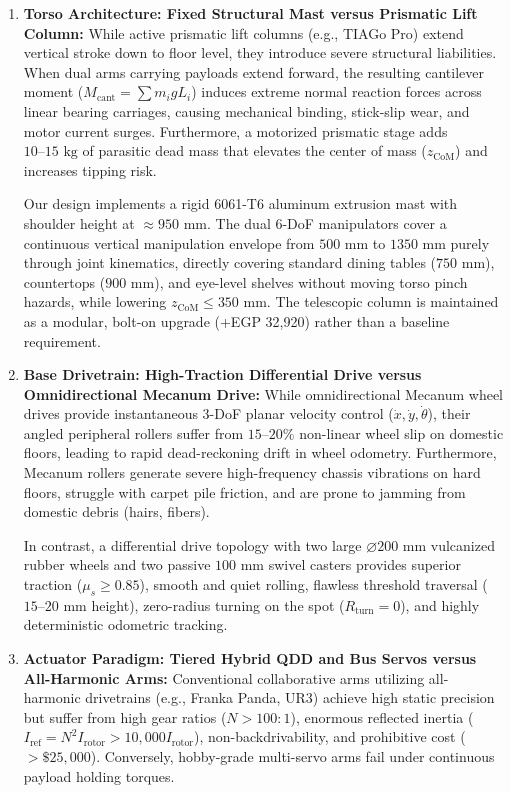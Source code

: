 \begin{enumerate}[leftmargin=1.5em]
  \item \textbf{Torso Architecture: Fixed Structural Mast versus Prismatic Lift Column:}
  While active prismatic lift columns (e.g., TIAGo Pro) extend vertical stroke down to floor level, they introduce severe structural liabilities. When dual arms carrying payloads extend forward, the resulting cantilever moment ($M_{\text{cant}} = \sum m_i g L_i$) induces extreme normal reaction forces across linear bearing carriages, causing mechanical binding, stick-slip wear, and motor current surges. Furthermore, a motorized prismatic stage adds $10\text{--}15\text{ kg}$ of parasitic dead mass that elevates the center of mass ($z_{\text{CoM}}$) and increases tipping risk.
  
  Our design implements a rigid 6061-T6 aluminum extrusion mast with shoulder height at $\approx 950\text{ mm}$. The dual 6-DoF manipulators cover a continuous vertical manipulation envelope from $500\text{ mm}$ to $1350\text{ mm}$ purely through joint kinematics, directly covering standard dining tables ($750\text{ mm}$), countertops ($900\text{ mm}$), and eye-level shelves without moving torso pinch hazards, while lowering $z_{\text{CoM}} \le 350\text{ mm}$. The telescopic column is maintained as a modular, bolt-on upgrade (+EGP 32,920) rather than a baseline requirement.

  \item \textbf{Base Drivetrain: High-Traction Differential Drive versus Omnidirectional Mecanum Drive:}
  While omnidirectional Mecanum wheel drives provide instantaneous 3-DoF planar velocity control ($\dot{x}, \dot{y}, \dot{\theta}$), their angled peripheral rollers suffer from $15\text{--}20\%$ non-linear wheel slip on domestic floors, leading to rapid dead-reckoning drift in wheel odometry. Furthermore, Mecanum rollers generate severe high-frequency chassis vibrations on hard floors, struggle with carpet pile friction, and are prone to jamming from domestic debris (hairs, fibers).
  
  In contrast, a differential drive topology with two large $\varnothing 200\text{ mm}$ vulcanized rubber wheels and two passive $100\text{ mm}$ swivel casters provides superior traction ($\mu_s \ge 0.85$), smooth and quiet rolling, flawless threshold traversal ($15\text{--}20\text{ mm}$ height), zero-radius turning on the spot ($R_{\text{turn}} = 0$), and highly deterministic odometric tracking.

  \item \textbf{Actuator Paradigm: Tiered Hybrid QDD and Bus Servos versus All-Harmonic Arms:}
  Conventional collaborative arms utilizing all-harmonic drivetrains (e.g., Franka Panda, UR3) achieve high static precision but suffer from high gear ratios ($N > 100:1$), enormous reflected inertia ($I_{\text{ref}} = N^2 I_{\text{rotor}} > 10{,}000 I_{\text{rotor}}$), non-backdrivability, and prohibitive cost ($>\$25{,}000$). Conversely, hobby-grade multi-servo arms fail under continuous payload holding torques.
  

\end{enumerate}
